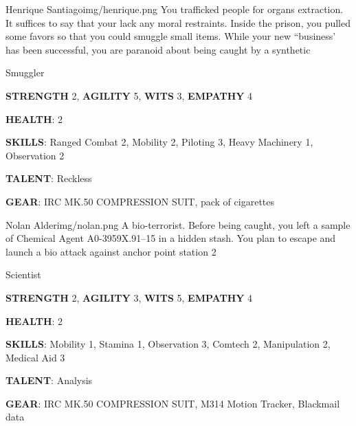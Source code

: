 \newsect

\medskip \medskip \medskip \medskip \medskip  \medskip \medskip \medskip \medskip \medskip \medskip \medskip \medskip \medskip \medskip  \medskip \medskip \medskip \medskip \medskip 

\begin{rpg-pcbox}{Henrique Santiago}{img/henrique.png}
    You trafficked people for organs extraction. It suffices to say that your lack any moral restraints.
    Inside the prison, you pulled some favors so that you could smuggle small items. While your new ``business' has been successful, you are paranoid about being caught by a synthetic
\end{rpg-pcbox}

\begin{rpg-commentbox}{}
    Smuggler

    \textbf{STRENGTH} 2, \textbf{AGILITY} 5, \textbf{WITS} 3, \textbf{EMPATHY} 4

    \textbf{HEALTH}: 2

    \textbf{SKILLS}: Ranged Combat 2, Mobility 2, Piloting 3, Heavy Machinery 1, Observation 2
    
    \textbf{TALENT}: Reckless
    
    \textbf{GEAR}: IRC MK.50 COMPRESSION SUIT, pack of cigarettes
\end{rpg-commentbox}

\newsect

\begin{rpg-pcbox}{Nolan Alder}{img/nolan.png}
    A bio-terrorist. Before being caught, you left a sample of Chemical Agent A0-3959X.91–15 in a hidden stash. You plan to escape and launch a bio attack against anchor point station 2
\end{rpg-pcbox}

\begin{rpg-commentbox}{}
    Scientist

    \textbf{STRENGTH} 2, \textbf{AGILITY} 3, \textbf{WITS} 5, \textbf{EMPATHY} 4

    \textbf{HEALTH}: 2

    \textbf{SKILLS}: Mobility 1, Stamina 1, Observation 3, Comtech 2, Manipulation 2, Medical Aid 3
    
    \textbf{TALENT}: Analysis
    
    \textbf{GEAR}: IRC MK.50 COMPRESSION SUIT, M314 Motion Tracker, Blackmail data
\end{rpg-commentbox}


\clearpage

